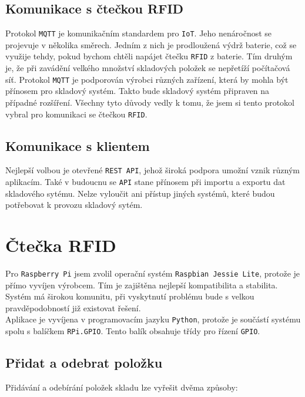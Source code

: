\documentclass[czech,BP]{thesiskiv}
\begin{document}
		\subsection{Komunikace s čtečkou RFID}
			Protokol \texttt{MQTT} je komunikačním standardem pro \texttt{IoT}. Jeho nenáročnost se projevuje v několika směrech. Jedním z nich je prodloužená výdrž baterie, což se využije tehdy, pokud bychom chtěli napájet čtečku \texttt{RFID} z baterie. Tím druhým je, že při zavádění velkého množství skladových položek se nepřetíží počítačová síť. 
			Protokol \texttt{MQTT} je podporován výrobci různých zařízení, která by mohla být přínosem pro skladový systém. Takto bude skladový systém připraven na případné rozšíření.
			Všechny tyto důvody vedly k tomu, že jsem si tento protokol vybral pro komunikaci se čtečkou \texttt{RFID}.
			


		\subsection{Komunikace s klientem}
			Nejlepší volbou je otevřené \texttt{REST API}, jehož široká podpora umožní vznik různým aplikacím.
 			Také v budoucnu se \texttt{API} stane přínosem při importu a exportu dat skladového sytému.
			Nelze vyloučit ani přístup jiných systémů, které budou potřebovat k provozu skladový sytém.





		\section{Čtečka RFID}
			Pro \texttt{Raspberry Pi} jsem zvolil operační systém \texttt{Raspbian Jessie Lite}, protože je přímo vyvíjen výrobcem. Tím je zajištěna nejlepší kompatibilita a stabilita. 
			Systém má širokou komunitu, při vyskytnutí problému bude s velkou pravděpodobností již existovat řešení.\\
			Aplikace je vyvíjena v programovacím jazyku \texttt{Python}, protože je součástí systému spolu s balíčkem \texttt{RPi.GPIO}. Tento balík obsahuje třídy pro řízení \texttt{GPIO}.


		\subsection{Přidat a odebrat položku}
			Přidávání a odebírání položek skladu lze vyřešit dvěma způsoby:	
			
\end{document}
